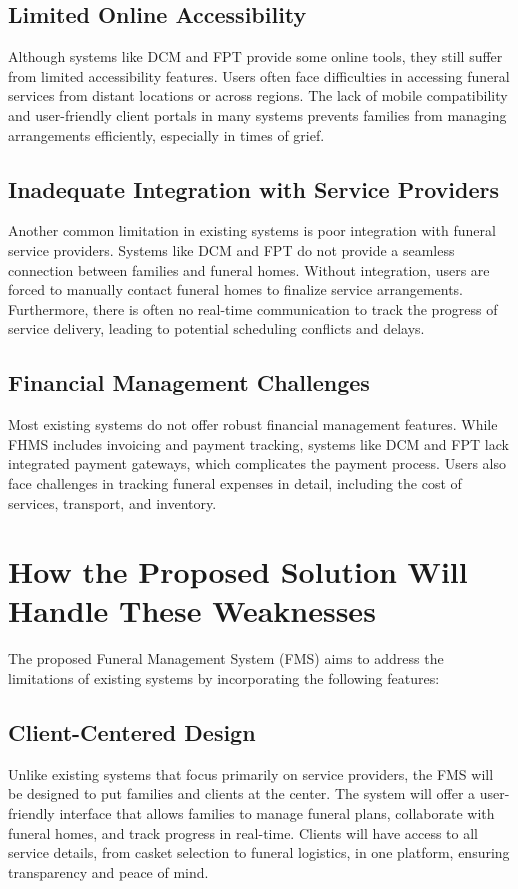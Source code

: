 \documentclass[a4paper,12pt]{report}
\begin{document}
\subsection{Limited Online Accessibility}
Although systems like DCM and FPT provide some online tools, they still suffer from limited accessibility features. Users often face difficulties in accessing funeral services from distant locations or across regions. The lack of mobile compatibility and user-friendly client portals in many systems prevents families from managing arrangements efficiently, especially in times of grief.

\subsection{Inadequate Integration with Service Providers}
Another common limitation in existing systems is poor integration with funeral service providers. Systems like DCM and FPT do not provide a seamless connection between families and funeral homes. Without integration, users are forced to manually contact funeral homes to finalize service arrangements. Furthermore, there is often no real-time communication to track the progress of service delivery, leading to potential scheduling conflicts and delays.

\subsection{Financial Management Challenges}
Most existing systems do not offer robust financial management features. While FHMS includes invoicing and payment tracking, systems like DCM and FPT lack integrated payment gateways, which complicates the payment process. Users also face challenges in tracking funeral expenses in detail, including the cost of services, transport, and inventory.

\section{How the Proposed Solution Will Handle These Weaknesses}
The proposed Funeral Management System (FMS) aims to address the limitations of existing systems by incorporating the following features:

\subsection{Client-Centered Design}
Unlike existing systems that focus primarily on service providers, the FMS will be designed to put families and clients at the center. The system will offer a user-friendly interface that allows families to manage funeral plans, collaborate with funeral homes, and track progress in real-time. Clients will have access to all service details, from casket selection to funeral logistics, in one platform, ensuring transparency and peace of mind.
\end{document}
